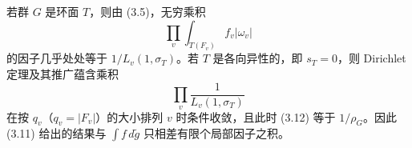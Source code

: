若群 $G$ 是环面 $T$，则由 (3.5)，无穷乘积
\begin{equation}\tag{3.11}
\prod_v\int_{T(F_v)}f_v|\omega_v|
\end{equation}
的因子几乎处处等于 $1/L_v(1,\sigma_T)$。若 $T$ 是各向异性的，即 $s_T=0$，则 Dirichlet 定理及其推广蕴含乘积
\begin{equation}\tag{3.12}
\prod_v\frac{1}{L_v(1,\sigma_T)}
\end{equation}
在按 $q_v$（$q_v=|F_v|$）的大小排列 $v$ 时条件收敛，且此时 (3.12) 等于 $1/\rho_G$。因此 (3.11) 给出的结果与 $\int f\,d\tilde g$ 只相差有限个局部因子之积。
